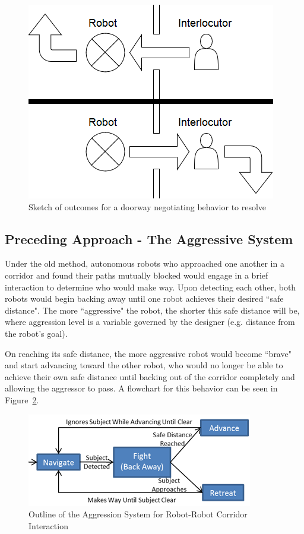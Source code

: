\documentclass[letterpaper, 10 pt, conference]{ieeeconf}  %
\begin{document}
    \begin{figure}
      \centering
      \includegraphics{wireframe.png}
      \caption{Sketch of outcomes for a doorway negotiating behavior to resolve}
      \label{fig:Wireframe}
   \end{figure}

\subsection{Preceding Approach - The Aggressive System}

Under the old method\cite{c1}, autonomous robots who approached one another in a corridor and found their paths mutually blocked would engage in a brief interaction to determine who would make way. Upon detecting each other, both robots would begin backing away until one robot achieves their desired ``safe distance". The more ``aggressive" the robot, the shorter this safe distance will be, where aggression level is a variable governed by the designer (e.g. distance from the robot’s goal).

On reaching its safe distance, the more aggressive robot would become ``brave" and start advancing toward the other robot, who would no longer be able to achieve their own safe distance until backing out of the corridor completely and allowing the aggressor to pass. A flowchart for this behavior can be seen in Figure~\ref{fig:Aggressive}.
 
    \begin{figure}
      \centering
      \includegraphics{aggressive_behavior.png}
      \caption{Outline of the Aggression System for Robot-Robot Corridor Interaction}
      \label{fig:Aggressive}
   \end{figure}
 
\end{document}
